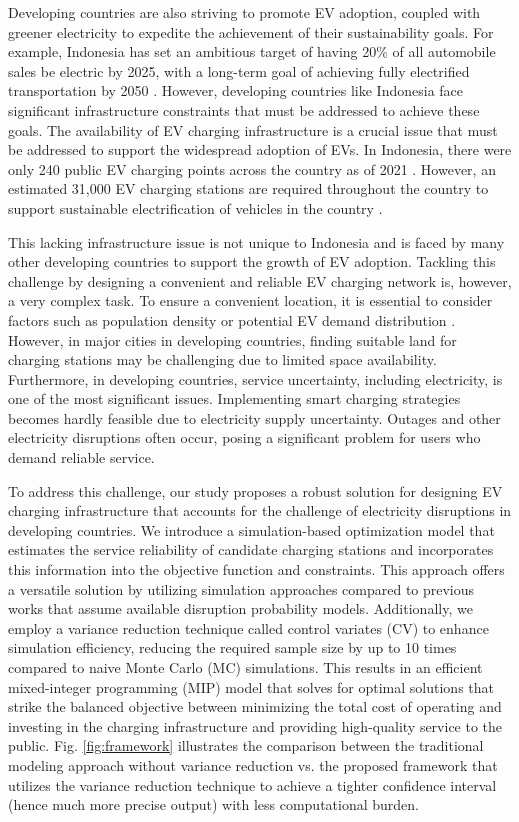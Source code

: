 \documentclass[preprint]{oscmjournal}
\theoremstyle{remark}
\begin{document}
Developing countries are also striving to promote EV adoption, coupled with greener electricity \autocite{lai2022critical} to expedite the achievement of their sustainability goals. For example, Indonesia has set an ambitious target of having 20\% of all automobile sales be electric by 2025, with a long-term goal of achieving fully electrified transportation by 2050 \autocite{indonesiaenergy}. However, developing countries like Indonesia face significant infrastructure constraints that must be addressed to achieve these goals. The availability of EV charging infrastructure is a crucial issue that must be addressed to support the widespread adoption of EVs. In Indonesia, there were only 240 public EV charging points across the country as of 2021 \autocite{ev_240}. However, an estimated 31,000 EV charging stations are required throughout the country to support sustainable electrification of vehicles in the country \autocite{ev_31000}. 

This lacking infrastructure issue is not unique to Indonesia and is faced by many other developing countries to support the growth of EV adoption. Tackling this challenge by designing a convenient and reliable EV charging network is, however, a very complex task. To ensure a convenient location, it is essential to consider factors such as population density or potential EV demand distribution \autocite{khalid2019comprehensive}. However, in major cities in developing countries, finding suitable land for charging stations may be challenging due to limited space availability. Furthermore, in developing countries, service uncertainty, including electricity, is one of the most significant issues. Implementing smart charging strategies \autocite{fachrizal2020smart} becomes hardly feasible due to electricity supply uncertainty. Outages and other electricity disruptions often occur, posing a significant problem for users who demand reliable service. 


To address this challenge, our study proposes a robust solution for designing EV  charging infrastructure that accounts for the challenge of electricity disruptions in developing countries. We introduce a simulation-based optimization model that estimates the service reliability of candidate charging stations and incorporates this information into the objective function and constraints. This approach offers a versatile solution by utilizing simulation approaches compared to previous works that assume available disruption probability models. Additionally, we employ a variance reduction technique called control variates (CV) to enhance simulation efficiency, reducing the required sample size by up to 10 times compared to naive Monte Carlo (MC) simulations. This results in an efficient mixed-integer programming (MIP) model that solves for optimal solutions that strike the balanced objective between minimizing the total cost of operating and investing in the charging infrastructure and providing high-quality service to the public. Fig. \ref{fig:framework} illustrates the comparison between the traditional modeling approach without variance reduction vs. the proposed framework that utilizes the variance reduction technique to achieve a tighter confidence interval (hence much more precise output) with less computational burden.
\end{document}
